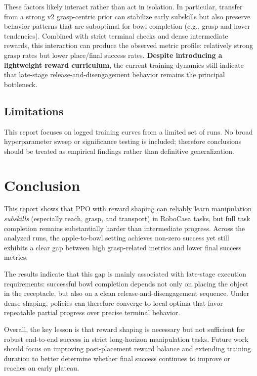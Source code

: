 \documentclass[11pt]{article}
\begin{document}
These factors likely interact rather than act in isolation. In particular, transfer
from a strong v2 grasp-centric prior can stabilize early subskills but also preserve
behavior patterns that are suboptimal for bowl completion (e.g., grasp-and-hover
tendencies). Combined with strict terminal checks and dense intermediate rewards,
this interaction can produce the observed metric profile: relatively strong grasp
rates but lower place/final success rates. \textbf{Despite introducing a lightweight
reward curriculum}, the current training dynamics still indicate that late-stage
release-and-disengagement behavior remains the principal bottleneck.

\subsection{Limitations}
This report focuses on logged training curves from a limited set of runs. No broad
hyperparameter sweep or significance testing is included; therefore conclusions
should be treated as empirical findings rather than definitive generalization.

\section{Conclusion}
This report shows that PPO with reward shaping can reliably learn manipulation
\emph{subskills} (especially reach, grasp, and transport) in RoboCasa tasks, but
full task completion remains substantially harder than intermediate progress.
Across the analyzed runs, the apple-to-bowl setting achieves non-zero success yet
still exhibits a clear gap between high grasp-related metrics and lower final
success metrics.

The results indicate that this gap is mainly associated with late-stage execution
requirements: successful bowl completion depends not only on placing the object in
the receptacle, but also on a clean release-and-disengagement sequence. Under dense
shaping, policies can therefore converge to local optima that favor repeatable
partial progress over precise terminal behavior.

Overall, the key lesson is that reward shaping is necessary but not sufficient for
robust end-to-end success in strict long-horizon manipulation tasks. Future work
should focus on improving post-placement reward balance and extending training
duration to better determine whether final success continues to improve or reaches
an early plateau.

\end{document}

